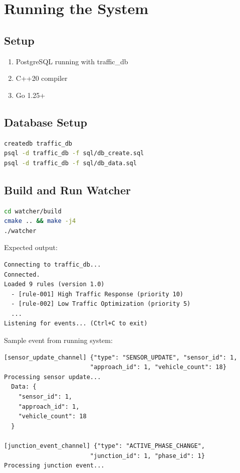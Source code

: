 \documentclass[12pt,a4paper]{article}
\begin{document}
\section{Running the System}

\subsection{Setup}

\begin{enumerate}
    \item PostgreSQL running with traffic\_db
    \item C++20 compiler
    \item Go 1.25+
\end{enumerate}

\subsection{Database Setup}

\begin{lstlisting}[language=bash,style=mystyle]
createdb traffic_db
psql -d traffic_db -f sql/db_create.sql
psql -d traffic_db -f sql/db_data.sql
\end{lstlisting}

\subsection{Build and Run Watcher}

\begin{lstlisting}[language=bash,style=mystyle]
cd watcher/build
cmake .. && make -j4
./watcher
\end{lstlisting}

Expected output:
\begin{verbatim}
Connecting to traffic_db...
Connected.
Loaded 9 rules (version 1.0)
  - [rule-001] High Traffic Response (priority 10)
  - [rule-002] Low Traffic Optimization (priority 5)
  ...
Listening for events... (Ctrl+C to exit)
\end{verbatim}

Sample event from running system:
\begin{verbatim}
[sensor_update_channel] {"type": "SENSOR_UPDATE", "sensor_id": 1, 
                        "approach_id": 1, "vehicle_count": 18}
Processing sensor update...
  Data: {
    "sensor_id": 1,
    "approach_id": 1,
    "vehicle_count": 18
  }

[junction_event_channel] {"type": "ACTIVE_PHASE_CHANGE", 
                        "junction_id": 1, "phase_id": 1}
Processing junction event...
\end{verbatim}
\end{document}
